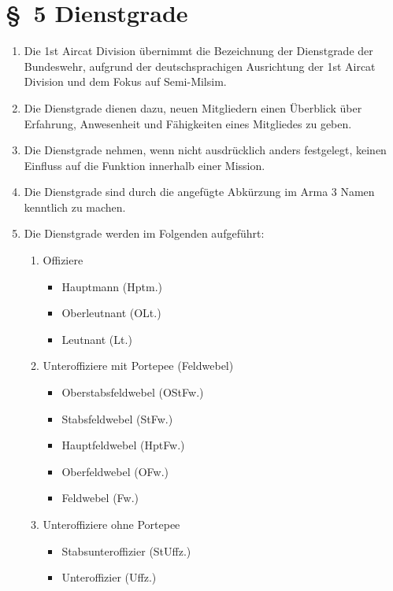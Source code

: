 \newpage
\section*{\S~5 Dienstgrade}
\label{sec:dienstgrade}

\begin{enumerate}[label=(\arabic*)]
    \item Die 1st Aircat Division übernimmt die Bezeichnung der Dienstgrade der Bundeswehr, aufgrund der deutschsprachigen Ausrichtung der 1st Aircat Division und dem Fokus auf Semi-Milsim.    
    \item Die Dienstgrade dienen dazu, neuen Mitgliedern einen Überblick über Erfahrung, Anwesenheit und Fähigkeiten eines Mitgliedes zu geben.
    \item Die Dienstgrade nehmen, wenn nicht ausdrücklich anders festgelegt, keinen Einfluss auf die Funktion innerhalb einer Mission.
    \item Die Dienstgrade sind durch die angefügte Abkürzung im Arma 3 Namen kenntlich zu machen.  
    \item Die Dienstgrade werden im Folgenden aufgeführt:
    \begin{enumerate}[label=(\Alph*)]
        \item Offiziere
        \begin{itemize}
            \item Hauptmann (Hptm.)
            \item Oberleutnant (OLt.)
            \item Leutnant (Lt.)
        \end{itemize}    
        \item Unteroffiziere mit Portepee (Feldwebel)
        \begin{itemize}
            \item Oberstabsfeldwebel (OStFw.)
            \item Stabsfeldwebel (StFw.)
            \item Hauptfeldwebel (HptFw.)
            \item Oberfeldwebel (OFw.)
            \item Feldwebel (Fw.)
        \end{itemize}  
        \item Unteroffiziere ohne Portepee
        \begin{itemize}
            \item Stabsunteroffizier (StUffz.)
            \item Unteroffizier (Uffz.)

\end{itemize}
\end{enumerate}
\end{enumerate}
